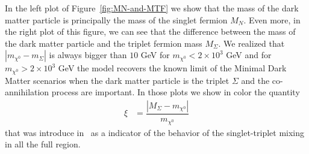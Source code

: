 \documentclass[12pt,letterpaper]{article}
\begin{document}
In the left plot of Figure~\ref{fig:MN-and-MTF} we show that the mass of the dark matter particle is principally the mass of the singlet fermion $M_N$. Even more, in the right plot of this figure, we can see that the difference between the mass of the dark matter particle and the triplet fermion mass $M_{\Sigma}$. 
We realized that $|m_{\chi^0} -m_{\Sigma}|$ is always bigger than $10$ GeV  for $m_{\chi^0}<2\times 10^3$ GeV and for $m_{\chi^0} >2\times 10^3$ GeV the model recovers the known limit of the Minimal Dark Matter scenarios when the dark matter particle is the triplet $\Sigma$ and the co-annihilation process are important. 
In those plots we show in color the quantity
%
\begin{align}
\label{eq:xi}
\xi &=\dfrac{|M_\Sigma - m_{\chi^0}|}{m_{\chi^0}}
\end{align}
%
that was introduce in~\cite{Hirsch:2013ola} as a indicator of the behavior of the singlet-triplet mixing in all the full region.
%
\end{document}
